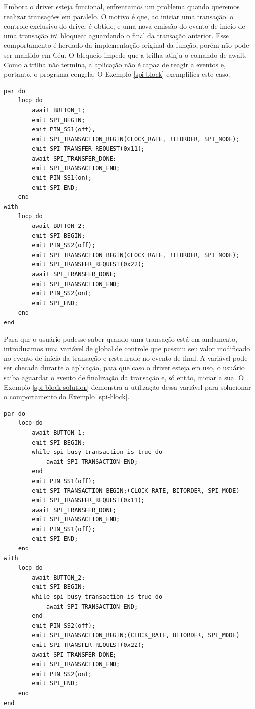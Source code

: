 \documentclass[11pt]{article}
\begin{document}
\par Embora o driver esteja funcional, enfrentamos um problema quando queremos realizar transações em paralelo. O motivo é que, ao iniciar uma transação, o controle exclusivo do driver é obtido, e uma nova emissão do evento de início de uma transação irá bloquear aguardando o final da transação anterior. Esse comportamento é herdado da implementação original da função, porém não pode ser mantido em Céu. O bloqueio impede que a trilha atinja o comando de await. Como a trilha não termina, a aplicação não é capaz de reagir a eventos e, portanto, o programa congela. O Exemplo \ref{spi-block} exemplifica este caso.
\begin{lstlisting}[style=CStyle,label=spi-block,caption=Aplicação congela pelas transações concorrentes]
par do
    loop do
        await BUTTON_1;
        emit SPI_BEGIN;
        emit PIN_SS1(off);
        emit SPI_TRANSACTION_BEGIN(CLOCK_RATE, BITORDER, SPI_MODE);
        emit SPI_TRANSFER_REQUEST(0x11);
        await SPI_TRANSFER_DONE;
        emit SPI_TRANSACTION_END;
        emit PIN_SS1(on);
        emit SPI_END;
    end
with
    loop do
        await BUTTON_2;
        emit SPI_BEGIN;
        emit PIN_SS2(off);
        emit SPI_TRANSACTION_BEGIN(CLOCK_RATE, BITORDER, SPI_MODE);
        emit SPI_TRANSFER_REQUEST(0x22);
        await SPI_TRANSFER_DONE;
        emit SPI_TRANSACTION_END;
        emit PIN_SS2(on);
        emit SPI_END;
    end
end
\end{lstlisting}
\par Para que o usuário pudesse saber quando uma transação está em andamento, introduzimos uma variável de global de controle que possuiu seu valor modificado no evento de início da transação e restaurado no evento de final. A variável pode ser checada durante a aplicação, para que caso o driver esteja em uso, o usuário saiba aguardar o evento de finalização da transação e, só então, iniciar a sua. O Exemplo \ref{spi-block-solution} demonstra a utilização dessa variável para solucionar o comportamento do Exemplo \ref{spi-block}.
\begin{lstlisting}[style=CStyle,label=spi-block-solution,caption=Aplicação utiliza a variável para não congelar]
par do
    loop do
        await BUTTON_1;
        emit SPI_BEGIN;
        while spi_busy_transaction is true do
            await SPI_TRANSACTION_END;
        end
        emit PIN_SS1(off);
        emit SPI_TRANSACTION_BEGIN;(CLOCK_RATE, BITORDER, SPI_MODE)
        emit SPI_TRANSFER_REQUEST(0x11);
        await SPI_TRANSFER_DONE;
        emit SPI_TRANSACTION_END;
        emit PIN_SS1(off);
        emit SPI_END;
    end
with
    loop do
        await BUTTON_2;
        emit SPI_BEGIN;
        while spi_busy_transaction is true do
            await SPI_TRANSACTION_END;
        end
        emit PIN_SS2(off);
        emit SPI_TRANSACTION_BEGIN;(CLOCK_RATE, BITORDER, SPI_MODE)
        emit SPI_TRANSFER_REQUEST(0x22);
        await SPI_TRANSFER_DONE;
        emit SPI_TRANSACTION_END;
        emit PIN_SS2(on);
        emit SPI_END;
    end
end
\end{lstlisting}
\end{document}
